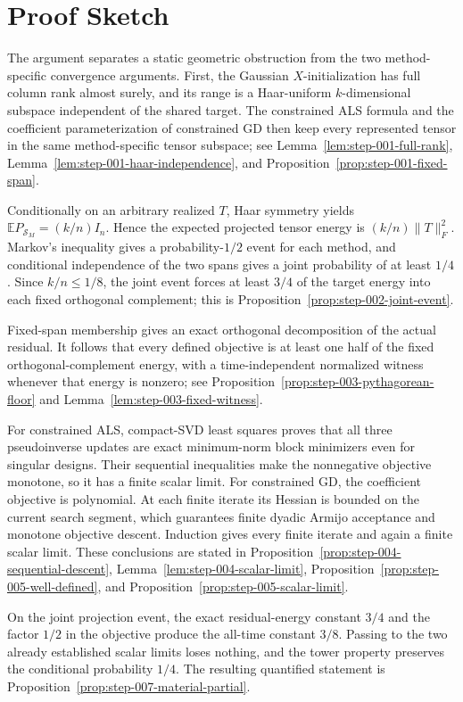\section{Proof Sketch}

The argument separates a static geometric obstruction from the two
method-specific convergence arguments.  First, the Gaussian $X$-initialization
has full column rank almost surely, and its range is a Haar-uniform
$k$-dimensional subspace independent of the shared target.  The constrained
ALS formula and the coefficient parameterization of constrained GD then keep
every represented tensor in the same method-specific tensor subspace; see
Lemma~\ref{lem:step-001-full-rank},
Lemma~\ref{lem:step-001-haar-independence}, and
Proposition~\ref{prop:step-001-fixed-span}.

Conditionally on an arbitrary realized $T$, Haar symmetry yields
$\mathbb E P_{\mathcal S_M}=(k/n)I_n$.  Hence the expected projected tensor
energy is $(k/n)\|T\|_F^2$.  Markov's inequality gives a probability-$1/2$
event for each method, and conditional independence of the two spans gives a
joint probability of at least $1/4$.  Since $k/n\le1/8$, the joint event forces
at least $3/4$ of the target energy into each fixed orthogonal complement;
this is Proposition~\ref{prop:step-002-joint-event}.

Fixed-span membership gives an exact orthogonal decomposition of the actual
residual.  It follows that every defined objective is at least one half of the
fixed orthogonal-complement energy, with a time-independent normalized witness
whenever that energy is nonzero; see
Proposition~\ref{prop:step-003-pythagorean-floor} and
Lemma~\ref{lem:step-003-fixed-witness}.

For constrained ALS, compact-SVD least squares proves that all three
pseudoinverse updates are exact minimum-norm block minimizers even for singular
designs.  Their sequential inequalities make the nonnegative objective
monotone, so it has a finite scalar limit.  For constrained GD, the coefficient
objective is polynomial.  At each finite iterate its Hessian is bounded on the
current search segment, which guarantees finite dyadic Armijo acceptance and
monotone objective descent.  Induction gives every finite iterate and again a
finite scalar limit.  These conclusions are stated in
Proposition~\ref{prop:step-004-sequential-descent},
Lemma~\ref{lem:step-004-scalar-limit},
Proposition~\ref{prop:step-005-well-defined}, and
Proposition~\ref{prop:step-005-scalar-limit}.

On the joint projection event, the exact residual-energy constant $3/4$ and
the factor $1/2$ in the objective produce the all-time constant $3/8$.
Passing to the two already established scalar limits loses nothing, and the
tower property preserves the conditional probability $1/4$.  The resulting
quantified statement is Proposition~\ref{prop:step-007-material-partial}.

